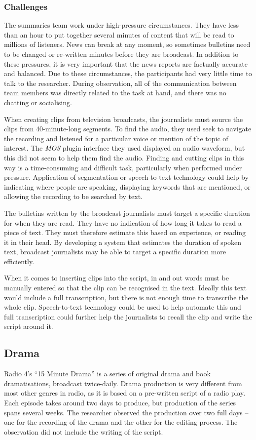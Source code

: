 \subsubsection{Challenges}

The summaries team work under high-pressure circumstances. They have less than an hour to put together several minutes
of content that will be read to millions of listeners. News can break at any moment, so sometimes bulletins need to be
changed or re-written minutes before they are broadcast. In addition to these pressures, it is very important that the
news reports are factually accurate and balanced.  Due to these circumstances, the participants had very little time to
talk to the researcher. During observation, all of the communication between team members was directly related to the
task at hand, and there was no chatting or socialising.

When creating clips from television broadcasts, the journalists must source the clips from 40-minute-long segments.  To
find the audio, they used seek to navigate the recording and listened for a particular voice or mention of the topic of
interest.  The \textit{MOS} plugin interface they used displayed an audio waveform, but this did not seem to help them
find the audio.  Finding and cutting clips in this way is a time-consuming and difficult task, particularly when
performed under pressure.  Application of segmentation or speech-to-text technology could help by indicating where
people are speaking, displaying keywords that are mentioned, or allowing the recording to be searched by text.

The bulletins written by the broadcast journalists must target a specific duration for when they are read.  They have
no indication of how long it takes to read a piece of text. They must therefore estimate this based on experience, or
reading it in their head.  By developing a system that estimates the duration of spoken text, broadcast journalists may
be able to target a specific duration more efficiently. 

When it comes to inserting clips into the script, in and out words must be manually entered so that the clip can be
recognised in the text. Ideally this text would include a full transcription, but there is not enough time to
transcribe the whole clip.  Speech-to-text technology could be used to help automate this and full transcription could
further help the journalists to recall the clip and write the script around it.

\subsection{Drama}\label{sec:drama}
Radio 4's ``15 Minute Drama'' is a series of original drama and book dramatisations, broadcast twice-daily. Drama
production is very different from most other genres in radio, as it is based on a pre-written script of a radio play.
Each episode takes around two days to produce, but production of the series spans several weeks.  The researcher
observed the production over two full days -- one for the recording of the drama and the other for the editing process.
The observation did not include the writing of the script.

